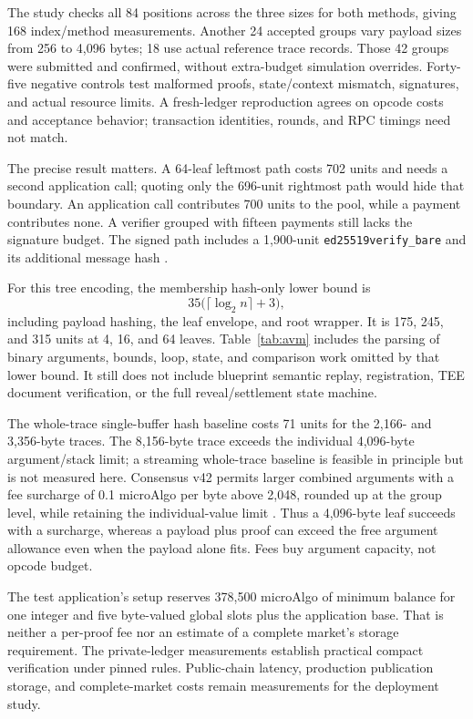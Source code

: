 The study checks all 84 positions across the three sizes for both methods, giving 168 index/method measurements. Another 24 accepted groups vary payload sizes from 256 to 4,096 bytes; 18 use actual reference trace records. Those 42 groups were submitted and confirmed, without extra-budget simulation overrides. Forty-five negative controls test malformed proofs, state/context mismatch, signatures, and actual resource limits. A fresh-ledger reproduction agrees on opcode costs and acceptance behavior; transaction identities, rounds, and RPC timings need not match.

The precise result matters. A 64-leaf leftmost path costs 702 units and needs a second application call; quoting only the 696-unit rightmost path would hide that boundary. An application call contributes 700 units to the pool, while a payment contributes none. A verifier grouped with fifteen payments still lacks the signature budget. The signed path includes a 1,900-unit \texttt{ed25519verify\_bare} and its additional message hash \cite{algorandopcodes2026,algorandcosts2026}.

For this tree encoding, the membership hash-only lower bound is
\[
35\bigl(\lceil\log_2 n\rceil+3\bigr),
\]
including payload hashing, the leaf envelope, and root wrapper. It is 175, 245, and 315 units at 4, 16, and 64 leaves. Table~\ref{tab:avm} includes the parsing of binary arguments, bounds, loop, state, and comparison work omitted by that lower bound. It still does not include blueprint semantic replay, registration, TEE document verification, or the full reveal/settlement state machine.

The whole-trace single-buffer hash baseline costs 71 units for the 2,166- and 3,356-byte traces. The 8,156-byte trace exceeds the individual 4,096-byte argument/stack limit; a streaming whole-trace baseline is feasible in principle but is not measured here. Consensus v42 permits larger combined arguments with a fee surcharge of 0.1 microAlgo per byte above 2,048, rounded up at the group level, while retaining the individual-value limit \cite{algorandfees2026}. Thus a 4,096-byte leaf succeeds with a surcharge, whereas a payload plus proof can exceed the free argument allowance even when the payload alone fits. Fees buy argument capacity, not opcode budget.

The test application's setup reserves 378,500 microAlgo of minimum balance for one integer and five byte-valued global slots plus the application base. That is neither a per-proof fee nor an estimate of a complete market's storage requirement. The private-ledger measurements establish practical compact verification under pinned rules. Public-chain latency, production publication storage, and complete-market costs remain measurements for the deployment study.

